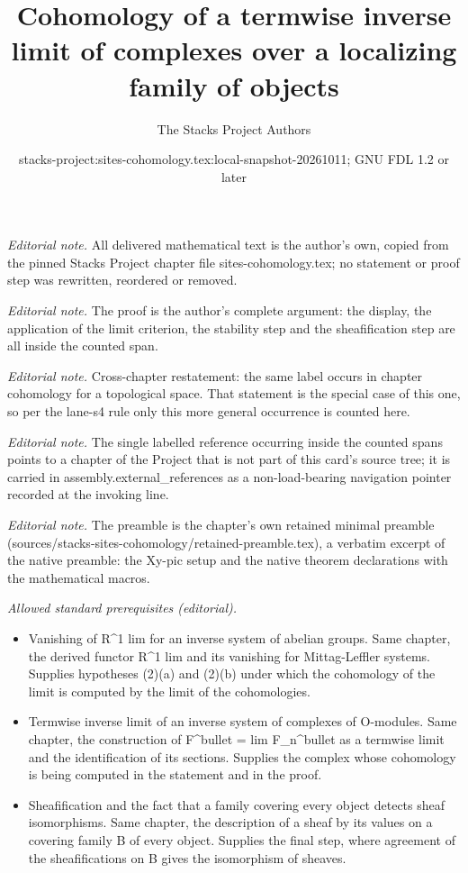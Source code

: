 \documentclass[10pt,a4paper]{amsart}
\title{Cohomology of a termwise inverse limit of complexes over a localizing family of objects}
\author{The Stacks Project Authors}
\date{stacks-project:sites-cohomology.tex:local-snapshot-20261011; GNU FDL 1.2 or later}
\theoremstyle{plain}
\theoremstyle{definition}
\theoremstyle{remark}
\numberwithin{equation}{subsection}
\begin{document}
\maketitle
\noindent\textit{Editorial note.} All delivered mathematical text is the author's own, copied from the pinned Stacks Project chapter file sites-cohomology.tex; no statement or proof step was rewritten, reordered or removed.\par\medskip
\noindent\textit{Editorial note.} The proof is the author's complete argument: the display, the application of the limit criterion, the stability step and the sheafification step are all inside the counted span.\par\medskip
\noindent\textit{Editorial note.} Cross-chapter restatement: the same label occurs in chapter cohomology for a topological space. That statement is the special case of this one, so per the lane-s4 rule only this more general occurrence is counted here.\par\medskip
\noindent\textit{Editorial note.} The single labelled reference occurring inside the counted spans points to a chapter of the Project that is not part of this card's source tree; it is carried in assembly.external\_references as a non-load-bearing navigation pointer recorded at the invoking line.\par\medskip
\noindent\textit{Editorial note.} The preamble is the chapter's own retained minimal preamble (sources/stacks-sites-cohomology/retained-preamble.tex), a verbatim excerpt of the native preamble: the Xy-pic setup and the native theorem declarations with the mathematical macros.\par\medskip
\noindent\textit{Allowed standard prerequisites (editorial).}\begin{itemize}
\item Vanishing of R\textasciicircum{}1 lim for an inverse system of abelian groups. Same chapter, the derived functor R\textasciicircum{}1 lim and its vanishing for Mittag-Leffler systems. Supplies hypotheses (2)(a) and (2)(b) under which the cohomology of the limit is computed by the limit of the cohomologies.
\item Termwise inverse limit of an inverse system of complexes of O-modules. Same chapter, the construction of F\textasciicircum{}bullet = lim F\_n\textasciicircum{}bullet as a termwise limit and the identification of its sections. Supplies the complex whose cohomology is being computed in the statement and in the proof.
\item Sheafification and the fact that a family covering every object detects sheaf isomorphisms. Same chapter, the description of a sheaf by its values on a covering family B of every object. Supplies the final step, where agreement of the sheafifications on B gives the isomorphism of sheaves.
\end{itemize}\medskip
\end{document}
